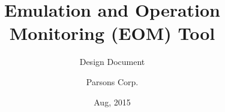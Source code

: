 \documentclass[12pt]{scrartcl}
\begin{document}
\setcounter{secnumdepth}{3}
\setcounter{tocdepth}{3}

\onehalfspacing
\setlength{\parindent}{4em}
\setlength{\parskip}{1em}

\title{Emulation and Operation Monitoring (EOM) Tool}
\subtitle{Design Document}
\author{Parsons Corp.}
\date{Aug, 2015}
\maketitle

\thispagestyle{empty}


\end{document}
